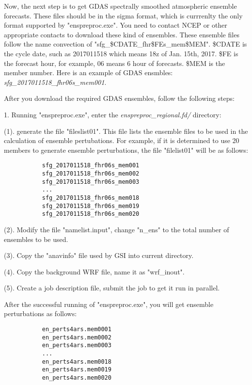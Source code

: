 Now, the next step is to get GDAS spectrally smoothed atmospheric ensemble forecasts. These files should be in the sigma format, which is currrenlty the only format supported by "enspreproc.exe". You need to contact NCEP or other appropriate contacts to download these kind of ensembles. These ensemble files follow the name convection of "sfg\_\$CDATE\_fhr\$FEs\_mem\$MEM". \$CDATE is the cycle date, such as 2017011518 which means 18z of Jan. 15th, 2017. \$FE is the forecast hour, for example, 06 means 6 hour of forecasts. \$MEM is the member number. Here is an example of GDAS ensmbles: \textit{sfg\_2017011518\_fhr06s\_mem001}. 

After you download the required GDAS ensembles, follow the following steps:

1. Running "enspreproc.exe", enter the \textit{enspreproc\_regional.fd/} directory:

(1). generate the file "fileslist01". This file lists the ensemble files to be used in the calculation of ensemble pertubations. For example, if it is determined to use 20 members to generate ensemble perturbations, the file "filelist01" will be as follows:
\begin{scriptsize}
\begin{verbatim}
           sfg_2017011518_fhr06s_mem001
           sfg_2017011518_fhr06s_mem002
           sfg_2017011518_fhr06s_mem003
           ...
           sfg_2017011518_fhr06s_mem018
           sfg_2017011518_fhr06s_mem019
           sfg_2017011518_fhr06s_mem020
\end{verbatim}
\end{scriptsize}

(2). Modify the file "namelist.input", change "n\_ens" to the total number of ensembles to be used.

(3). Copy the "anavinfo" file used by GSI into current directory.

(4). Copy the background WRF file, name it as "wrf\_inout".

(5). Create a job description file, submit the job to get it run in parallel.

After the successful running of "enspreproc.exe", you will get ensemble perturbations as follows:
\begin{scriptsize}
\begin{verbatim}
           en_perts4ars.mem0001
           en_perts4ars.mem0002
           en_perts4ars.mem0003
           ...
           en_perts4ars.mem0018
           en_perts4ars.mem0019
           en_perts4ars.mem0020
\end{verbatim}
\end{scriptsize}

